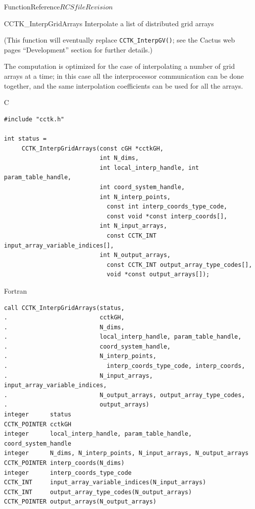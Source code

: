 \begin{cactuspart}{FunctionReference}{$RCSfile$}{$Revision$}

\begin{FunctionDescription}{CCTK\_InterpGridArrays}
\label{CCTK-InterpGridArrays}
Interpolate a list of distributed grid arrays

(This function will eventually replace \verb|CCTK_InterpGV()|;
see the Cactus web pages ``Development'' section for further details.)

The computation is optimized for the case of interpolating a
number of grid arrays at a time; in this case all the interprocessor
communication can be done together, and the same interpolation
coefficients can be used for all the arrays.

\begin{SynopsisSection}
\begin{Synopsis}{C}
\begin{verbatim}
#include "cctk.h"

int status =
     CCTK_InterpGridArrays(const cGH *cctkGH,
                           int N_dims,
                           int local_interp_handle, int param_table_handle,
                           int coord_system_handle,
                           int N_interp_points,
                             const int interp_coords_type_code,
                             const void *const interp_coords[],
                           int N_input_arrays,
                             const CCTK_INT input_array_variable_indices[],
                           int N_output_arrays,
                             const CCTK_INT output_array_type_codes[],
                             void *const output_arrays[]);
\end{verbatim}
\end{Synopsis}
\begin{Synopsis}{Fortran}
\begin{verbatim}
call CCTK_InterpGridArrays(status,
.                          cctkGH,
.                          N_dims,
.                          local_interp_handle, param_table_handle,
.                          coord_system_handle,
.                          N_interp_points,
.                            interp_coords_type_code, interp_coords,
.                          N_input_arrays, input_array_variable_indices,
.                          N_output_arrays, output_array_type_codes,
.                          output_arrays)
integer      status
CCTK_POINTER cctkGH
integer      local_interp_handle, param_table_handle, coord_system_handle
integer      N_dims, N_interp_points, N_input_arrays, N_output_arrays
CCTK_POINTER interp_coords(N_dims)
integer      interp_coords_type_code
CCTK_INT     input_array_variable_indices(N_input_arrays)
CCTK_INT     output_array_type_codes(N_output_arrays)
CCTK_POINTER output_arrays(N_output_arrays)
\end{verbatim}
\end{Synopsis}
\end{SynopsisSection}


\end{FunctionDescription}
\end{cactuspart}
